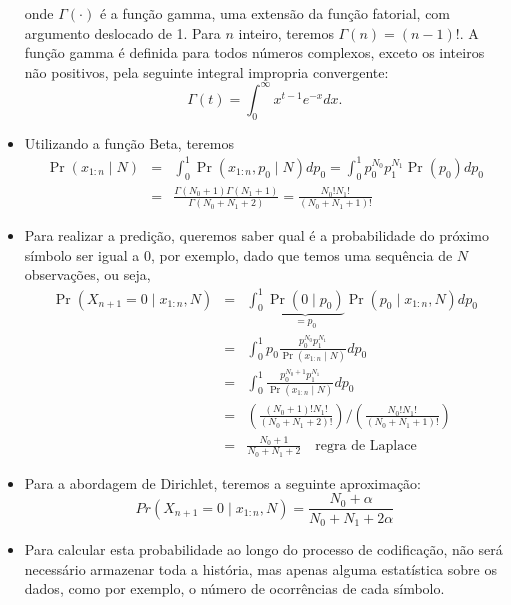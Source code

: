 \begin{frame}[allowframebreaks]
\begin{itemize}
\begin{equation}
        \end{equation}
	onde $\Gamma(\cdot)$ é a função gamma, uma extensão da função fatorial, com argumento deslocado de 1.
	Para $n$ inteiro, teremos $\Gamma(n) = (n-1)!$. A função gamma é definida para todos números complexos,
	exceto os inteiros não positivos, pela seguinte integral impropria convergente:
	\begin{equation}
	\Gamma(t) = \int_0^\infty x^{t-1} e^{-x} dx .
	\end{equation}
  \item Utilizando a função Beta, teremos
	\begin{eqnarray}
	\Pr (x_{1:n} \mid N) &=& \int_0^1 \Pr (x_{1:n}, p_0 \mid N) dp_0 = \int_0^1 p_0^{N_0} p_1^{N_1} \Pr(p_0) dp_0 \nonumber \\
		&=& \frac{\Gamma(N_0 + 1) \Gamma(N_1 + 1)}{ \Gamma(N_0 + N_1 + 2) } = \frac{ N_0! N_1! }{ (N_0 + N_1 +1)! }
        \end{eqnarray}
  \item Para realizar a predição, queremos saber qual é a probabilidade do próximo símbolo ser igual a $0$, por exemplo, 
	dado que temos uma sequência de $N$ observações, ou seja,
	\begin{eqnarray}
	\Pr(X_{n+1} = 0 \mid x_{1:n},N) &=& \int_0^1 \underbrace{ \Pr(0 \mid p_0) }_{ = p_0} \Pr(p_0 \mid x_{1:n}, N) dp_0 \nonumber \\
			&=& \int_0^1 p_0 \frac{p_0^{N_0} p_1^{N_1}}{\Pr(x_{1:n} \mid N)} dp_0 \nonumber \\
			&=& \int_0^1 \frac{p_0^{N_0 +1} p_1^{N_1}}{\Pr(x_{1:n} \mid N)} dp_0 \nonumber \\
			&=& \left( \frac{(N_0 + 1)! N_1!}{(N_0 + N_1 + 2)!} \right) / \left( \frac{ N_0! N_1! }{ (N_0 + N_1 +1)!  } \right) \nonumber \\
			&=& \frac{ N_0 + 1  }{ N_0 + N_1 + 2}  \quad \text{regra de Laplace}
        \end{eqnarray}
  \end{itemize}

  \framebreak

  \begin{itemize}
  \item Para a abordagem de Dirichlet, teremos a seguinte aproximação:
	\begin{equation}
	Pr(X_{n+1} = 0 \mid x_{1:n},N) = \frac{ N_0 + \alpha  }{ N_0 + N_1 + 2\alpha}
	\end{equation} 

  \item Para calcular esta probabilidade ao longo do processo de codificação, não será necessário armazenar toda
	a história, mas apenas alguma estatística sobre os dados, como por exemplo, o número de ocorrências de cada símbolo.
  \end{itemize}


\end{frame}
